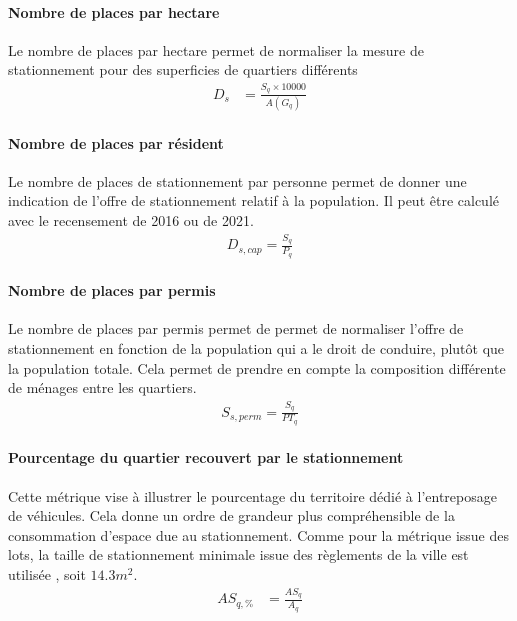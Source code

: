             \paragraph{Nombre de places par hectare} Le nombre de places par hectare permet de normaliser la mesure de stationnement pour des superficies de quartiers différents
            \begin{align}
                D_s &= \frac{S_q\times 10000}{A(G_q)} \label{eq:stat-sup}
            \end{align}
            \paragraph{Nombre de places par résident} Le nombre de places de stationnement par personne permet de donner une indication de l'offre de stationnement relatif à la population. Il peut être calculé avec le recensement de 2016 ou de 2021.
            \begin{align}
                D_{s,cap}= \frac{S_q}{P_q} \label{eq:stat-pop}
            \end{align}
            \paragraph{Nombre de places par permis} Le nombre de places par permis permet de permet de normaliser l'offre de stationnement en fonction de la population qui a le droit de conduire, plutôt que la population totale. Cela permet de prendre en compte la composition différente de ménages entre les quartiers. 
            \begin{align}
                S_{s,perm} = \frac{S_q}{PT_q}\label{eq:stat-perm}
            \end{align}
            \paragraph{Pourcentage du quartier recouvert par le stationnement} Cette métrique vise à illustrer le pourcentage du territoire dédié à l'entreposage de véhicules. Cela donne un ordre de grandeur plus compréhensible de la consommation d'espace due au stationnement. Comme pour la métrique issue des lots, la taille de stationnement minimale issue des règlements de la ville est utilisée \parencite{ville_de_quebec_rvq_2009}, soit $14.3m^{2}$.
            \begin{align}
                AS_{q,\%} &= \frac{AS_{q}}{A_q}\label{eq:stat-perc}
            \end{align}
